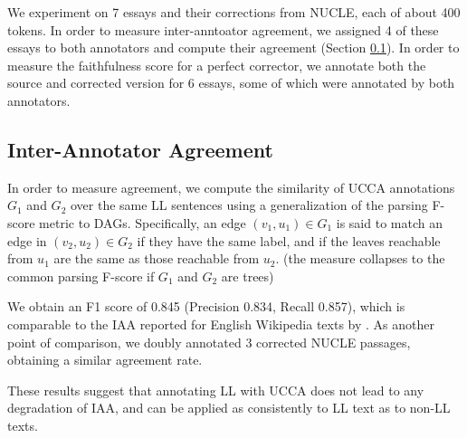 \documentclass[letter,11pt]{article}
\begin{document}
{We experiment on 7 essays and their corrections from NUCLE, each of about 400 tokens.
In order to measure inter-anntoator agreement, we assigned 4 of these essays to both annotators
and compute their agreement (Section \ref{sec:iaa}).
In order to measure the faithfulness score for a perfect corrector, we annotate both
the source and corrected version for 6 essays, some of which were annotated by
both annotators.


\subsection{Inter-Annotator Agreement}\label{sec:iaa}

In order to measure agreement, we
compute the similarity of UCCA annotations $G_1$ and $G_2$ over the same LL sentences
using a generalization of the parsing F-score metric to DAGs. Specifically, an
edge $(v_1,u_1) \in G_1$ is said to match an edge in $(v_2,u_2) \in G_2$ if
they have the same label, and if the leaves
reachable from $u_1$ are the same as those reachable from $u_2$. 
(the measure collapses to the common parsing F-score if $G_1$ and $G_2$ are trees)

We obtain an F1 score of 0.845 (Precision 0.834, Recall 0.857), which
is comparable to the IAA reported for English Wikipedia texts by \cite{abend2013universal}.
As another point of comparison, we doubly annotated 3 corrected NUCLE passages,
obtaining a similar agreement rate.

These results suggest that annotating LL with UCCA does not lead to any degradation
of IAA, and can be applied as consistently to LL text as to non-LL texts.




}
\end{document}
